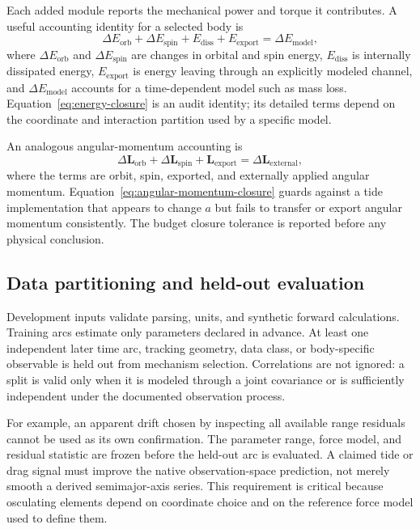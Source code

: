 \documentclass[10pt,conference]{IEEEtran}
\begin{document}
Each added module reports the mechanical power and torque it contributes. A useful accounting identity for a selected body is
\begin{equation}
\Delta E_{\mathrm{orb}}+\Delta E_{\mathrm{spin}}+E_{\mathrm{diss}}+E_{\mathrm{export}}=\Delta E_{\mathrm{model}},
\label{eq:energy-closure}
\end{equation}
where $\Delta E_{\mathrm{orb}}$ and $\Delta E_{\mathrm{spin}}$ are changes in orbital and spin energy, $E_{\mathrm{diss}}$ is internally dissipated energy, $E_{\mathrm{export}}$ is energy leaving through an explicitly modeled channel, and $\Delta E_{\mathrm{model}}$ accounts for a time-dependent model such as mass loss. Equation~\eqref{eq:energy-closure} is an audit identity; its detailed terms depend on the coordinate and interaction partition used by a specific model.

An analogous angular-momentum accounting is
\begin{equation}
\Delta \mathbf{L}_{\mathrm{orb}}+\Delta \mathbf{L}_{\mathrm{spin}}+\mathbf{L}_{\mathrm{export}}=\Delta \mathbf{L}_{\mathrm{external}},
\label{eq:angular-momentum-closure}
\end{equation}
where the terms are orbit, spin, exported, and externally applied angular momentum. Equation~\eqref{eq:angular-momentum-closure} guards against a tide implementation that appears to change $a$ but fails to transfer or export angular momentum consistently. The budget closure tolerance is reported before any physical conclusion.

\subsection{Data partitioning and held-out evaluation}

Development inputs validate parsing, units, and synthetic forward calculations. Training arcs estimate only parameters declared in advance. At least one independent later time arc, tracking geometry, data class, or body-specific observable is held out from mechanism selection. Correlations are not ignored: a split is valid only when it is modeled through a joint covariance or is sufficiently independent under the documented observation process.

For example, an apparent drift chosen by inspecting all available range residuals cannot be used as its own confirmation. The parameter range, force model, and residual statistic are frozen before the held-out arc is evaluated. A claimed tide or drag signal must improve the native observation-space prediction, not merely smooth a derived semimajor-axis series. This requirement is critical because osculating elements depend on coordinate choice and on the reference force model used to define them.
\end{document}
